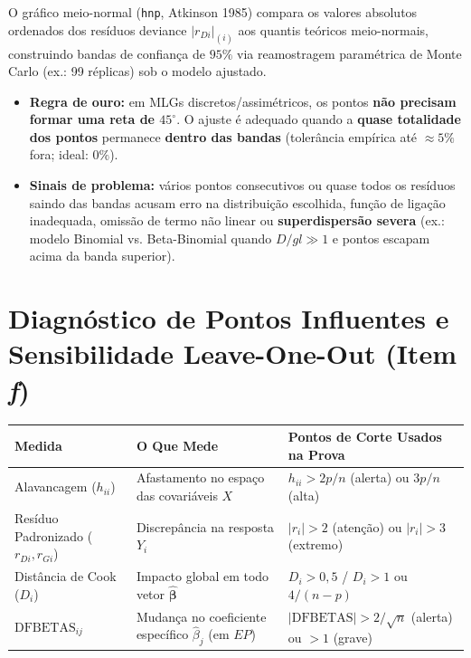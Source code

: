 \documentclass[11pt,a4paper]{article}
\begin{document}
O gráfico meio-normal (\texttt{hnp}, Atkinson 1985) compara os valores absolutos ordenados dos resíduos deviance $|r_{Di}|_{(i)}$ aos quantis teóricos meio-normais, construindo bandas de confiança de $95\%$ via reamostragem paramétrica de Monte Carlo (ex.: 99 réplicas) sob o modelo ajustado.

\begin{itemize}[leftmargin=1.4em]
  \item \textbf{Regra de ouro:} em MLGs discretos/assimétricos, os pontos \textbf{não precisam formar uma reta de $45^\circ$}. O ajuste é adequado quando a \textbf{quase totalidade dos pontos} permanece \textbf{dentro das bandas} (tolerância empírica até $\approx 5\%$ fora; ideal: $0\%$).
  \item \textbf{Sinais de problema:} vários pontos consecutivos ou quase todos os resíduos saindo das bandas acusam erro na distribuição escolhida, função de ligação inadequada, omissão de termo não linear ou \textbf{superdispersão severa} (ex.: modelo Binomial vs. Beta-Binomial quando $D/gl \gg 1$ e pontos escapam acima da banda superior).
\end{itemize}

\section{Diagnóstico de Pontos Influentes e Sensibilidade Leave-One-Out (Item \textit{f})}

\begin{center}
\small
\begin{tabular}{@{}lll@{}}
\toprule
\textbf{Medida} & \textbf{O Que Mede} & \textbf{Pontos de Corte Usados na Prova} \\
\midrule
Alavancagem ($h_{ii}$) & Afastamento no espaço das covariáveis $X$ & $h_{ii} > 2p/n$ (alerta) ou $3p/n$ (alta) \\
Resíduo Padronizado ($r_{Di}, r_{Gi}$) & Discrepância na resposta $Y_i$ & $|r_i| > 2$ (atenção) ou $|r_i| > 3$ (extremo) \\
Distância de Cook ($D_i$) & Impacto global em todo vetor $\hat{\boldsymbol{\beta}}$ & $D_i > 0{,}5$ / $D_i > 1$ ou $4/(n-p)$ \\
$\text{DFBETAS}_{ij}$ & Mudança no coeficiente específico $\hat{\beta}_j$ (em $EP$) & $|\text{DFBETAS}| > 2/\sqrt{n}$ (alerta) ou $> 1$ (grave) \\
\bottomrule
\end{tabular}
\end{center}
\end{document}
